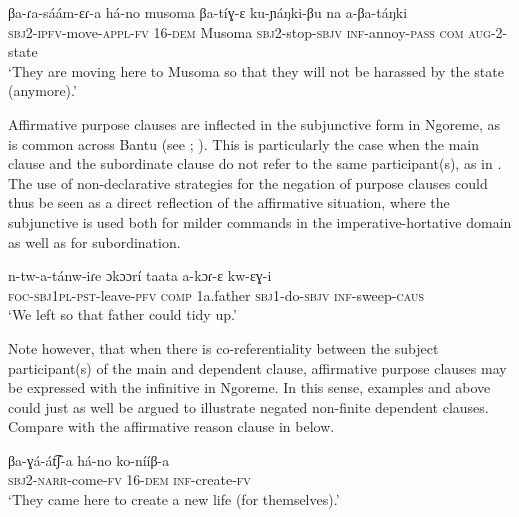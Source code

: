 \documentclass[output=paper,colorlinks,citecolor=brown,draftmode]{langscibook}
\begin{document}
\ea\label{ex:ngo:55} 
    \gll βa-ɾa-sáám-ɛɾ{}-a há-no musoma βa-tíɣ{}-ɛ ku-ɲáŋki-βu na a{}-βa-táŋki\\ 
        \textsc{sbj}2-\textsc{ipfv}{}-move-\textsc{appl-fv} 16-\textsc{dem} Musoma \textsc{sbj}2-stop-\textsc{sbjv} \textsc{inf}{}-annoy-\textsc{pass} \textsc{com} \textsc{aug-}2-state\\
    \glt ‘They are moving here to Musoma so that they will not be harassed by the state (anymore).’ 
\z 

Affirmative purpose clauses are inflected in the subjunctive form in Ngoreme, as is common across Bantu (see \citealt{NurseDevos2019}; \citealt{Devos2008}). This is particularly the case when the main clause and the subordinate clause do not refer to the same participant(s), as in . The use of non-declarative strategies for the negation of purpose clauses could thus be seen as a direct reflection of the affirmative situation, where the subjunctive is used both for milder commands in the imperative-hortative domain as well as for subordination.

\ea\label{ex:ngo:56} 
    \gll n{}-tw{}-a{}-tánw{}-iɾe ɔkɔɔrí taata a{}-kɔɾ{}-ɛ kw{}-ɛɣ{}-i\\ 
        \textsc{foc-sbj}1\textsc{pl}{}-\textsc{pst}{}-leave-\textsc{pfv} \textsc{comp} 1a.father \textsc{sbj}1-do-\textsc{sbjv} \textsc{inf}{}-sweep-\textsc{caus}\\
    \glt ‘We left so that father could tidy up.’
\z 

Note however, that when there is co-referentiality between the subject participant(s) of the main and dependent clause, affirmative purpose clauses may be expressed with the infinitive in Ngoreme. In this sense, examples  and  above could just as well be argued to illustrate negated non-finite dependent clauses. Compare  with the affirmative reason clause in  below. 

\ea\label{ex:ngo:57} 
    \gll βa-ɣá-át͡ʃ{}-a há-no ko-nííβ{}-a \\ 
        \textsc{sbj}2-\textsc{narr}{}-come-\textsc{fv} 16-\textsc{dem} \textsc{inf}{}-create-\textsc{fv}\\
    \glt ‘They came here to create a new life (for themselves).’
\z 
\end{document}

